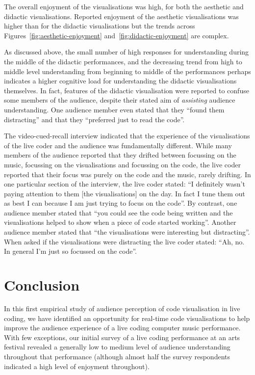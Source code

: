 \documentclass{sig-alternate}
\begin{document}
The overall enjoyment of the visualisations was high, for both the
aesthetic and didactic visualisations. Reported enjoyment of the
aesthetic visualisations was higher than for the didactic
visualisations but the trends across
Figures~\ref{fig:aesthetic-enjoyment} and~\ref{fig:didactic-enjoyment}
are complex.

As discussed above, the small number of high responses for
understanding during the middle of the didactic performances, and the
decreasing trend from high to middle level understanding from
beginning to middle of the performances perhaps indicates a higher
cognitive load for understanding the didactic visualisations
themselves. In fact, features of the didactic visualisation were
reported to confuse some members of the audience, despite their stated
aim of \emph{assisting} audience understanding. One audience member
even stated that they ``found them distracting'' and that they
``preferred just to read the code''.

The video-cued-recall interview indicated that the experience of the
visualisations of the live coder and the audience was fundamentally
different. While many members of the audience reported that they
drifted between focussing on the music, focussing on the
visualisations and focussing on the code, the live coder reported that
their focus was purely on the code and the music, rarely drifting. In
one particular section of the interview, the live coder stated: ``I
definitely wasn't paying attention to them [the visualisations] on the
day. In fact I tune them out as best I can because I am just trying to
focus on the code''. By contrast, one audience member stated that
``you could see the code being written and the visualisations helped
to show when a piece of code started working''. Another audience
member stated that ``the visualisations were interesting but
distracting''. When asked if the visualisations were distracting the
live coder stated: ``Ah, no. In general I'm just so focussed on the
code''.

\section{Conclusion}

In this first empirical study of audience perception of code
visualisation in live coding, we have identified an opportunity for
real-time code visualisations to help improve the audience experience
of a live coding computer music performance. With few exceptions, our
initial survey of a live coding performance at an arts festival
revealed a generally low to medium level of audience understanding
throughout that performance (although almost half the survey
respondents indicated a high level of enjoyment throughout).
\end{document}
